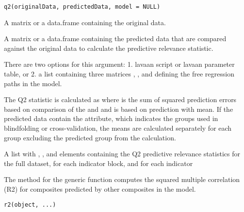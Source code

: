 \documentclass[a4paper]{book}
\begin{document}
%
\begin{Usage}
\begin{verbatim}
q2(originalData, predictedData, model = NULL)
\end{verbatim}
\end{Usage}
%
\begin{Arguments}
\begin{ldescription}
\item[\code{originalData}] A matrix or a data.frame containing the original data.

\item[\code{predictedData}] A matrix or a data.frame containing the predicted data that are compared
against the original data to calculate the predictive relevance statistic.

\item[\code{model}] There are two options for this argument: 1. lavaan script or lavaan parameter
table, or 2. a list containing three matrices
, , and  defining the free regression paths
in the model.
\end{ldescription}
\end{Arguments}
%
\begin{Details}\relax
The Q2 statistic is calculated as  where  is the sum of 
squared prediction errors based on comparison of the  and 
 and  is based on prediction with mean. If the predicted
data contain the  attribute, which indicates the groups used in blindfolding
or cross-validation, the means are calculated separately for each group excluding the 
predicted group from the calculation.
\end{Details}
%
\begin{Value}
A list with , , and  elements containing
the Q2 predictive relevance statistics for the full dataset, for each indicator block, and
for each indicator
\end{Value}
%
\begin{Description}\relax
The  method for the generic function  computes the squared multiple correlation (R2)
for composites predicted by other composites in the model.
\end{Description}
%
\begin{Usage}
\begin{verbatim}
r2(object, ...)
\end{verbatim}
\end{Usage}
\end{document}
